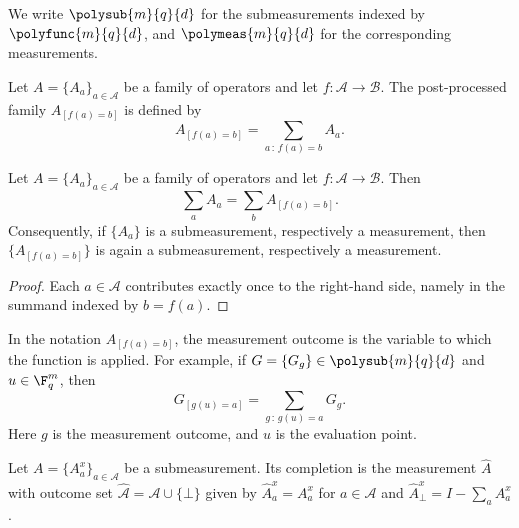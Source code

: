 \begin{definition}\label{def:polymeasurements}
	\leanok
	We write $\polysub{m}{q}{d}$ for the submeasurements indexed by $\polyfunc{m}{q}{d}$, and $\polymeas{m}{q}{d}$ for the corresponding measurements.
\end{definition}

\begin{definition}\label{def:post-processing}
	\leanok
	Let $A=\{A_a\}_{a \in \mathcal A}$ be a family of operators and let $f\colon \mathcal A \to \mathcal B$. The post-processed family $A_{[f(a)=b]}$ is defined by
	\[
		A_{[f(a)=b]} = \sum_{a\, :\, f(a)=b} A_a.
	\]
\end{definition}

\begin{proposition}\label{prop:post-processing-preserves}
	\leanok
	Let $A=\{A_a\}_{a \in \mathcal A}$ be a family of operators and let
	$f\colon \mathcal A \to \mathcal B$. Then
	\[
		\sum_a A_a = \sum_b A_{[f(a)=b]}.
	\]
	Consequently, if $\{A_a\}$ is a submeasurement, respectively a measurement, then
	$\{A_{[f(a)=b]}\}$ is again a submeasurement, respectively a measurement.
\end{proposition}
\begin{proof}
	\leanok
	Each $a \in \mathcal A$ contributes exactly once to the right-hand side, namely in
	the summand indexed by $b=f(a)$.
\end{proof}

\begin{remark}\label{rem:post-processing-notation}
	In the notation $A_{[f(a)=b]}$, the measurement outcome is the variable to which
	the function is applied. For example, if $G=\{G_g\} \in \polysub{m}{q}{d}$ and
	$u \in \F_q^m$, then
	\[
		G_{[g(u)=a]} = \sum_{g\,:\,g(u)=a} G_g.
	\]
	Here $g$ is the measurement outcome, and $u$ is the evaluation point.
\end{remark}

\begin{definition}\label{def:measurement-completion}
	\leanok
	Let $A=\{A_a^x\}_{a \in \mathcal A}$ be a submeasurement. Its completion is the measurement $\widehat A$ with outcome set $\widehat{\mathcal A}=\mathcal A \cup \{\bot\}$ given by $\widehat A_a^x=A_a^x$ for $a \in \mathcal A$ and $\widehat A_\bot^x = I-\sum_a A_a^x$.
\end{definition}


